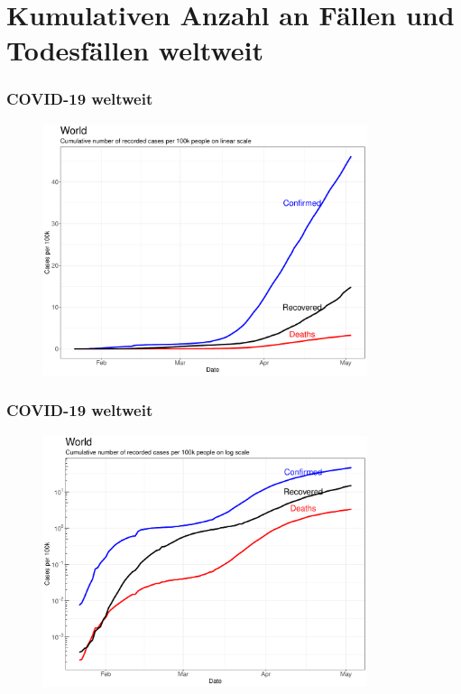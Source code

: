 \documentclass{beamer}
\begin{document}
 \section{Kumulativen Anzahl an Fällen und Todesfällen weltweit}
 \begin{frame}
 	\frametitle{COVID-19 weltweit}
	\begin{figure}
		\centering
		\includegraphics[width = 270pt]{Cases_world.pdf}
	\end{figure}
 \end{frame}

 \begin{frame}
 	\frametitle{COVID-19 weltweit}
	\begin{figure}
		\centering
		\includegraphics[width = 270pt]{Cases_world_log.pdf}
	\end{figure}
 \end{frame}
\end{document}
